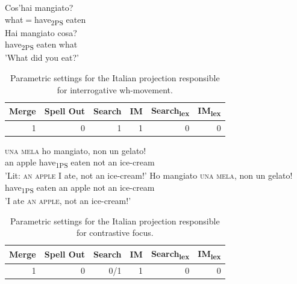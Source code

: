 \documentclass[fleqn,10pt]{wlscirep}
\begin{document}
\begin{exe}
    \ex
        \begin{xlist}
            \ex \gll Cos'hai mangiato?\\
            what$=$have\textsubscript{2PS} eaten\\
            \ex \gll * Hai mangiato cosa?\\
            {} have\textsubscript{2PS} eaten what\\
            \glt \hspace{2mm} 'What did you eat?'
        \end{xlist}
\end{exe}

\begin{table}[H]
    \centering
    \begin{tabular}{|r|r|r|r|r|r|}
    \hline
    Merge & Spell Out & Search & IM & Search\textsubscript{lex} & IM\textsubscript{lex} \\
    \hline
    1 & 0 & 1 & 1 & 0 & 0 \\
    \hline
    \end{tabular}
    \caption{\label{tab:samp}Parametric settings for the Italian projection responsible for interrogative wh-movement.}
\end{table}

\begin{exe}
    \ex
        \begin{xlist}
            \ex \gll \textsc{una} \textsc{mela} ho mangiato, non un gelato!\\
            an apple have\textsubscript{1PS} eaten not an ice-cream\\
            \glt 'Lit: \textsc{an} \textsc{apple} I ate, not an ice-cream!'
            \ex \gll Ho mangiato \textsc{una} \textsc{mela}, non un gelato!\\
            have\textsubscript{1PS} eaten an apple not an ice-cream\\
            \glt 'I ate \textsc{an} \textsc{apple}, not an ice-cream!'
        \end{xlist}
\end{exe}

\begin{table}[H]
    \centering
    \begin{tabular}{|r|r|r|r|r|r|}
    \hline
    Merge & Spell Out & Search & IM & Search\textsubscript{lex} & IM\textsubscript{lex} \\
    \hline
    1 & 0 & 0/1 & 1 & 0 & 0 \\
    \hline
    \end{tabular}
    \caption{\label{tab:samp}Parametric settings for the Italian projection responsible for contrastive focus.}
\end{table}
\end{document}
